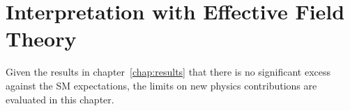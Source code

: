 \chapter{Interpretation with Effective Field Theory}
\label{chap:aQGC}
Given the results in chapter~\ref{chap:results} that there is no significant excess against the SM expectations, the limits on new physics contributions are evaluated in this chapter.
